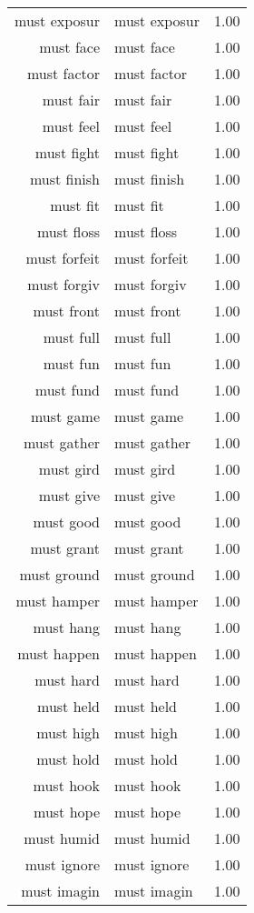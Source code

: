 \begin{table}[ht]
\begin{tabular}{rlr}
  must exposur & must exposur & 1.00 \\ 
  must face & must face & 1.00 \\ 
  must factor & must factor & 1.00 \\ 
  must fair & must fair & 1.00 \\ 
  must feel & must feel & 1.00 \\ 
  must fight & must fight & 1.00 \\ 
  must finish & must finish & 1.00 \\ 
  must fit & must fit & 1.00 \\ 
  must floss & must floss & 1.00 \\ 
  must forfeit & must forfeit & 1.00 \\ 
  must forgiv & must forgiv & 1.00 \\ 
  must front & must front & 1.00 \\ 
  must full & must full & 1.00 \\ 
  must fun & must fun & 1.00 \\ 
  must fund & must fund & 1.00 \\ 
  must game & must game & 1.00 \\ 
  must gather & must gather & 1.00 \\ 
  must gird & must gird & 1.00 \\ 
  must give & must give & 1.00 \\ 
  must good & must good & 1.00 \\ 
  must grant & must grant & 1.00 \\ 
  must ground & must ground & 1.00 \\ 
  must hamper & must hamper & 1.00 \\ 
  must hang & must hang & 1.00 \\ 
  must happen & must happen & 1.00 \\ 
  must hard & must hard & 1.00 \\ 
  must held & must held & 1.00 \\ 
  must high & must high & 1.00 \\ 
  must hold & must hold & 1.00 \\ 
  must hook & must hook & 1.00 \\ 
  must hope & must hope & 1.00 \\ 
  must humid & must humid & 1.00 \\ 
  must ignore & must ignore & 1.00 \\ 
  must imagin & must imagin & 1.00 \\ 

\end{tabular}
\end{table}
